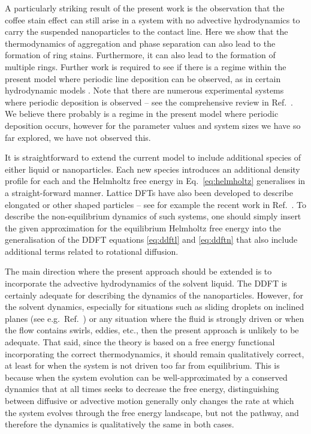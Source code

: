 \documentclass[journal=langd5,manuscript=article]{achemso}
\begin{document}
A particularly striking result of the present work is the observation that the coffee stain effect can still arise in a system with no advective hydrodynamics to carry the suspended nanoparticles to the contact line. Here we show that the thermodynamics of aggregation and phase separation can also lead to the formation of ring stains. Furthermore, it can also lead to the formation of multiple rings. Further work is required to see if there is a regime within the present model where periodic line deposition can be observed, as in certain hydrodynamic models \cite{frastia2011, frastia2012}. {Note that there are numerous experimental systems where periodic deposition is observed -- see the comprehensive review in Ref.~.} We believe there probably is a regime {in the present model} where periodic deposition occurs, however for the parameter values and system sizes we have so far explored, we have not observed this.

{It is straightforward to extend the current model to include additional species of either liquid or nanoparticles. Each new species introduces an additional density profile for each and the Helmholtz free energy in Eq.\ \eqref{eq:helmholtz} generalises in a straight-forward manner. Lattice DFTs have also been developed to describe elongated or other shaped particles -- see for example the recent work in Ref.\ . To describe the non-equilibrium dynamics of such systems, one should simply insert the given approximation for the equilibrium Helmholtz free energy into the generalisation of the DDFT equations \eqref{eq:ddftl} and \eqref{eq:ddftn} that also include additional terms related to rotational diffusion.\cite{wittkowski2011dynamical}}

The main direction where the present approach should be extended is to incorporate the advective hydrodynamics of the solvent liquid. The DDFT is certainly adequate for describing the dynamics of the nanoparticles. However, for the solvent dynamics, especially for situations such as sliding droplets on inclined planes (see e.g.\ Ref.~) {or any situation where the fluid is strongly driven or when the flow contains swirls, eddies, etc., then the present approach is unlikely to be} adequate. That said, since the theory is based on a free energy functional incorporating the correct thermodynamics, it should remain qualitatively correct, at least for when the system is not driven too far from equilibrium. {This is because when the system evolution can be well-approximated by a conserved dynamics that at all times seeks to decrease the free energy, distinguishing between diffusive or advective motion generally only changes the rate at which the system evolves through the free energy landscape, but not the pathway,\cite{honisch2015instabilities, yin2017films} and therefore the dynamics is qualitatively the same in both cases.}
\end{document}
